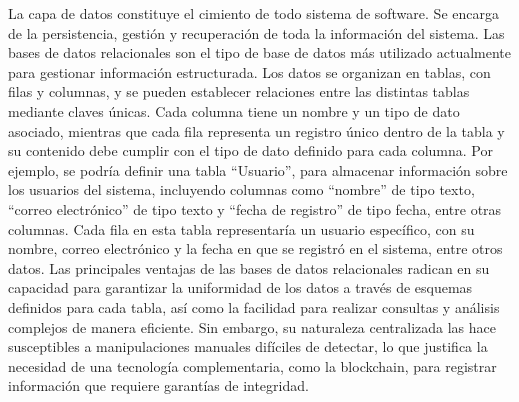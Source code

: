 La capa de datos constituye el cimiento de todo sistema de software. Se encarga de la persistencia, gestión y recuperación de toda la información del sistema. Las bases de datos relacionales son el tipo de base de datos más utilizado actualmente para gestionar información estructurada. Los datos se organizan en tablas, con filas y columnas, y se pueden establecer relaciones entre las distintas tablas mediante claves únicas. Cada columna tiene un nombre y un tipo de dato asociado, mientras que cada fila representa un registro único dentro de la tabla y su contenido debe cumplir con el tipo de dato definido para cada columna. Por ejemplo, se podría definir una tabla ``Usuario'', para almacenar información sobre los usuarios del sistema, incluyendo columnas como ``nombre'' de tipo texto, ``correo electrónico'' de tipo texto y ``fecha de registro'' de tipo fecha, entre otras columnas. Cada fila en esta tabla representaría un usuario específico, con su nombre, correo electrónico y la fecha en que se registró en el sistema, entre otros datos. Las principales ventajas de las bases de datos relacionales radican en su capacidad para garantizar la uniformidad de los datos a través de esquemas definidos para cada tabla, así como la facilidad para realizar consultas y análisis complejos de manera eficiente. Sin embargo, su naturaleza centralizada las hace susceptibles a manipulaciones manuales difíciles de detectar, lo que justifica la necesidad de una tecnología complementaria, como la blockchain, para registrar información que requiere garantías de integridad.

